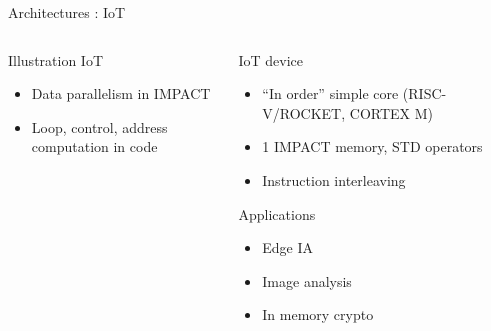 %
\begin{Frame}{Architectures : IoT}
  \begin{columns}[t]
    \begin{column}{\BW} %
      \begin{block}{Illustration IoT}
      \end{block}
      \begin{block}{}
        \begin{itemize}
        \item Data parallelism in IMPACT
        \item Loop, control, address computation in code
        \end{itemize}
      \end{block}
    \end{column}

    \begin{column}{\BW} %
      \begin{block}{IoT device}
        \begin{itemize}
        \item ``In order'' simple core (RISC-V/ROCKET, CORTEX M)
        \item 1 IMPACT memory, STD operators
        \item Instruction interleaving
        \end{itemize}
      \end{block}
      \begin{block}{Applications}
        \begin{itemize}
        \item Edge IA
        \item Image analysis
        \item In memory crypto
        \end{itemize}
      \end{block}
    \end{column}

  \end{columns}
\end{Frame}

